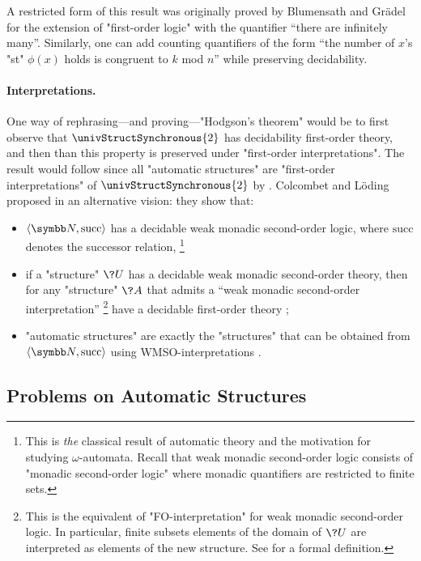 A restricted form of this result was originally proved by Blumensath and Grädel
\cite[Corollary~5.4]{BlumensathGradel2004FinitePresentations} for the extension of
"first-order logic" with the quantifier ``there are infinitely many''.
Similarly, one can add counting quantifiers of the form ``the number of $x$'s "st" $\phi(x)$ holds
is congruent to $k$ mod $n$'' \cite[\S~3.2]{Rubin2008AutomataPresentingStructures}
while preserving decidability.

\paragraph*{Interpretations.}
One way of rephrasing---and proving---"Hodgson's theorem" would be to first observe
that $\univStructSynchronous{2}$ has decidability first-order theory,
and then than this property is preserved under "first-order interpretations".
The result would follow since all "automatic structures" are "first-order interpretations"
of $\univStructSynchronous{2}$ by \label{prop:universal-automatic-structure}.
Colcombet and Löding proposed in \cite{ColcombetLoding2007WMSO} an alternative vision:
they show that:
\begin{itemize}
	\item $\tup{\N, \textrm{succ}}$ has a decidable weak monadic second-order logic,
		where $\textrm{succ}$ denotes the successor relation,%
		\footnote{This is \emph{the} classical result of automatic theory and the motivation
		for studying $\omega$-automata. Recall that weak monadic second-order 
		logic consists of "monadic second-order logic" where monadic quantifiers are
		restricted to finite sets.}
	\item if a "structure" $\?U$ has a decidable weak monadic second-order theory,
		then for any "structure" $\?A$ that admits a
		``weak monadic second-order interpretation''%
		\footnote{This is the equivalent
		of "FO-interpretation" for weak monadic second-order logic. In particular,
		finite subsets elements of the domain of $\?U$ are interpreted as elements of
		the new structure. See \cite[\S~2.3]{ColcombetLoding2007WMSO} for a formal definition.}
		have a decidable first-order theory
		\cite[Corollary~2.5]{ColcombetLoding2007WMSO};
	\item "automatic structures" are exactly the "structures" that can be obtained from
		$\tup{\N, \textrm{succ}}$ using WMSO-interpretations
		\cite[Proposition~3.1]{ColcombetLoding2007WMSO}.
\end{itemize}


\subsection{Problems on Automatic Structures}

